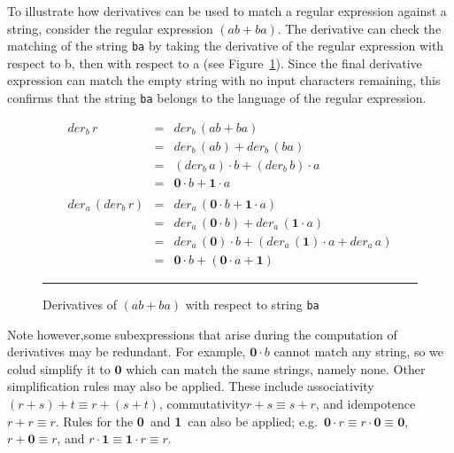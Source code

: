 \documentclass[12pt]{article}
\newcommand{\ZERO}{\textbf{0}}
\newcommand{\ONE}{\textbf{1}}
\newcommand{\der}{\textit{der}}
\begin{document}
To illustrate how derivatives can be used to match a regular expression against a string, 
consider the regular expression $( ab + ba )$.  The derivative can check the matching of the 
string \texttt{ba} by taking the derivative of the regular expression with respect to b,
then with respect to a (see Figure~\ref{derivative}). Since the final derivative expression 
can match the empty string with no input characters remaining, this confirms that the string
\texttt{ba} belongs to the language of the
regular expression.


\begin{figure}[ht]
  \begin{center}
    

\[
\begin{array}{rcl}
\der_b\, r           & =           &  \der_b\, (ab + ba) \\
                     & =           & \der_b\, (ab) + \der_b\, (ba) \\
                     & =           & (\der_b\, a) \cdot b + (\der_b\, b) \cdot a  \\
                     & =           & \ZERO \cdot b + \ONE \cdot a \\\\

\der_a\, (\der_b\, r) & =           & \der_a\, (\ZERO \cdot b + \ONE \cdot a)\\
                      & =           & \der_a\, (\ZERO \cdot b) + \der_a\, (\ONE \cdot a)\\
                      & =           & \der_a\, (\ZERO) \cdot b + (\der_a\, (\ONE) \cdot a + \der_a\, a)\\
                      & =           & \ZERO \cdot b + (\ZERO \cdot a + \ONE )
\end{array}
\]
    \mbox{}
    \rule{\linewidth}{0.4pt}
\caption{Derivatives of $(ab+ba)$ with respect to string \texttt{ba}}\label{derivative}
  \end{center}
\end{figure}

Note however,some subexpressions that arise during the computation of derivatives
may be redundant. For example, $\ZERO \cdot b$  cannot match any string, so 
we colud simplify it to $\ZERO$ which can match the same strings, namely none.
Other simplification rules may also be applied. These include associativity 
$(r+s)+t \equiv r+(s+t)$, commutativity$r+s \equiv s+r$, and idempotence 
$r+r \equiv r$. Rules for the \ZERO\ and \ONE\ can also be applied; e.g.\
 $\ZERO \cdot r \equiv r \cdot
\ZERO \equiv \ZERO$, $r+\ZERO \equiv r$, and $r \cdot \ONE \equiv \ONE \cdot r
\equiv r$.  
\end{document}
